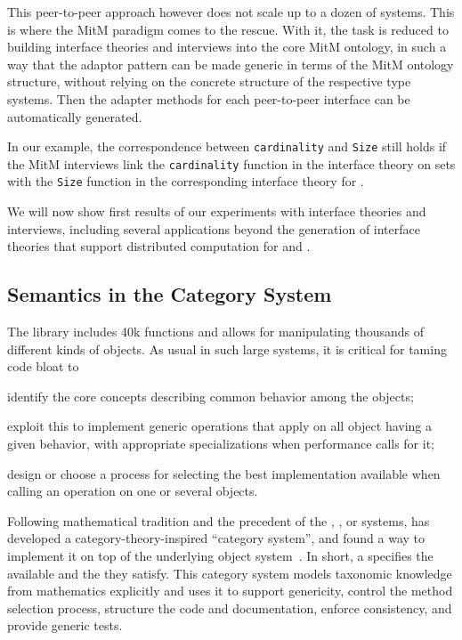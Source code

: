 This peer-to-peer approach however does not scale up to a dozen of
systems. This is where the MitM paradigm comes to the rescue. With it,
the task is reduced to building interface theories and interviews into
the core MitM ontology, in such a way that the adaptor pattern can be
made generic in terms of the MitM ontology structure, without relying
on the concrete structure of the respective type systems. Then the
adapter methods for each peer-to-peer interface can be automatically
generated.

In our example, the correspondence between \texttt{cardinality} and
\texttt{Size} still holds if the MitM interviews link the
\texttt{cardinality} function in the \Sage interface theory on sets
with the \texttt{Size} function in the corresponding interface theory
for \GAP.

We will now show first results of our experiments with interface
theories and interviews, including several applications beyond the
generation of interface theories that support distributed computation
for \Sage and \GAP.

\subsection{Semantics in the \Sage Category System}

The \Sage library includes 40k functions and allows for manipulating
thousands of different kinds of objects. As usual in such large
systems, it is critical for taming code bloat to
\begin{compactenum}[\em i\rm)]
\item identify the core concepts describing common behavior among the objects;
\item exploit this to implement generic operations that apply on all object having a given
  behavior, with appropriate specializations when performance calls for it;
\item design or choose a process for selecting the best implementation available when
  calling an operation on one or several objects.
\end{compactenum}

Following mathematical tradition and the precedent of the \Axiom,
\Fricas, or \MuPAD systems, \Sage has developed a
category-theory-inspired ``category system'', and found a way to
implement it on top of the underlying \Python object
system~\cite{Sage.Categories}. In short, a  specifies
the available  and the  they satisfy.
%
This category system models taxonomic knowledge from mathematics
explicitly and uses it to support genericity, control the method
selection process, structure the code and documentation, enforce
consistency, and provide generic tests.

